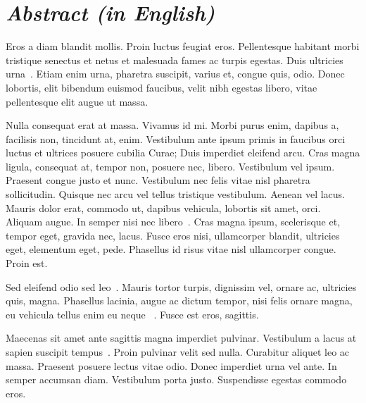 \clearpage
\chapter*{{\em Abstract (in English)}}

Eros a diam blandit mollis. Proin luctus feugiat eros. Pellentesque habitant
morbi tristique senectus et netus et malesuada fames ac turpis egestas. Duis
ultricies urna~\cite{DBLP:conf/time/Fournier-Sniehotta16,
DBLP:conf/ismir/Fournier-Sniehotta16, FRT17-InfoSystems}. Etiam enim urna,
pharetra suscipit, varius et, congue quis, odio. Donec lobortis, elit bibendum
euismod faucibus, velit nibh egestas libero, vitae pellentesque elit augue ut
massa.

Nulla consequat erat at massa. Vivamus id mi. Morbi purus enim, dapibus a,
facilisis non, tincidunt at, enim. Vestibulum ante ipsum primis in faucibus orci
luctus et ultrices posuere cubilia Curae; Duis imperdiet eleifend arcu. Cras
magna ligula, consequat at, tempor non, posuere nec, libero. Vestibulum vel
ipsum. Praesent congue justo et nunc. Vestibulum nec felis vitae nisl pharetra
sollicitudin. Quisque nec arcu vel tellus tristique vestibulum. Aenean vel
lacus. Mauris dolor erat, commodo ut, dapibus vehicula, lobortis sit amet, orci.
Aliquam augue. In semper nisi nec libero~\cite{bdcc6010023, ismirLBD22-Zhu}.
Cras magna ipsum, scelerisque et, tempor eget, gravida nec, lacus. Fusce eros
nisi, ullamcorper blandit, ultricies eget, elementum eget, pede. Phasellus id
risus vitae nisl ullamcorper congue. Proin est.

Sed eleifend odio sed
leo~\cite{foscarin:hal-02267454,FJF19b,foscarin:hal-01791404}. Mauris tortor
turpis, dignissim vel, ornare ac, ultricies quis, magna. Phasellus lacinia,
augue ac dictum tempor, nisi felis ornare magna, eu vehicula tellus enim eu
neque~\cite{foscarin:hal-03300102} . Fusce est eros, sagittis.

\medskip

Maecenas sit
amet ante sagittis magna imperdiet pulvinar. Vestibulum a lacus at sapien
suscipit tempus~\cite{ramaciottimorales:hal-03098374,morales:hal-02999863}.
Proin pulvinar velit sed nulla. Curabitur aliquet leo ac massa. Praesent posuere
lectus vitae odio. Donec imperdiet urna vel ante. In semper accumsan diam.
Vestibulum porta justo. Suspendisse egestas commodo eros.

